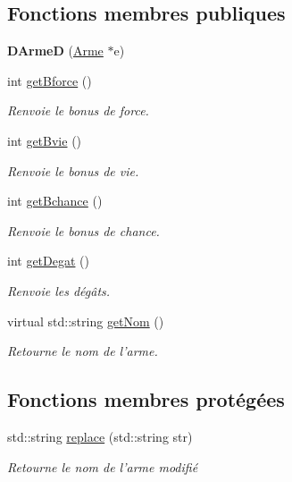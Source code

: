 \subsection*{Fonctions membres publiques}
\begin{DoxyCompactItemize}
\item 
\hypertarget{class_d_arme_d_ad486d2bfb8bd3d4657a1b09a85eb6865}{{\bfseries D\-Arme\-D} (\hyperlink{class_arme}{Arme} $\ast$e)}\label{class_d_arme_d_ad486d2bfb8bd3d4657a1b09a85eb6865}

\item 
int \hyperlink{class_d_arme_a76075bcbe61b20bd0e21e2d06fe33ab7}{get\-Bforce} ()
\begin{DoxyCompactList}\small\item\em Renvoie le bonus de force. \end{DoxyCompactList}\item 
int \hyperlink{class_d_arme_a91b3a3100969a568a8408ba098668398}{get\-Bvie} ()
\begin{DoxyCompactList}\small\item\em Renvoie le bonus de vie. \end{DoxyCompactList}\item 
int \hyperlink{class_d_arme_ad50d376b08d62276b7cf50d2cd59d619}{get\-Bchance} ()
\begin{DoxyCompactList}\small\item\em Renvoie le bonus de chance. \end{DoxyCompactList}\item 
int \hyperlink{class_d_arme_a7396e865674067f4f21a28e6babc0fad}{get\-Degat} ()
\begin{DoxyCompactList}\small\item\em Renvoie les dégâts. \end{DoxyCompactList}\item 
virtual std\-::string \hyperlink{class_arme_ab1b18cfa41fac19fccedf2165b9ff33c}{get\-Nom} ()
\begin{DoxyCompactList}\small\item\em Retourne le nom de l'arme. \end{DoxyCompactList}\end{DoxyCompactItemize}
\subsection*{Fonctions membres protégées}
\begin{DoxyCompactItemize}
\item 
std\-::string \hyperlink{class_d_arme_a604caa7ee656dab58d15b7cf86863e3d}{replace} (std\-::string str)
\begin{DoxyCompactList}\small\item\em Retourne le nom de l'arme modifié \end{DoxyCompactList}\end{DoxyCompactItemize}
